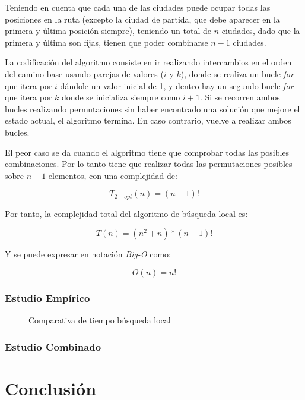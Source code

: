 \documentclass{uc3mpracticas}
\begin{document}
  \vspace{2mm}

  Teniendo en cuenta que cada una de las ciudades puede ocupar todas las posiciones en la ruta (excepto la ciudad de partida, que debe aparecer en la primera y última posición siempre), teniendo un total de $n$ ciudades, dado que la primera y última son fijas, tienen que poder combinarse $n-1$ ciudades.

  \vspace{2mm}

  La codificación del algoritmo consiste en ir realizando intercambios en el orden del camino base usando parejas de valores ($i$ y $k$), donde se realiza un bucle \textit{for} que itera por $i$ dándole un valor inicial de 1, y dentro hay un segundo bucle \textit{for} que itera por $k$ donde se inicializa siempre como $i+1$. Si se recorren ambos bucles realizando permutaciones sin haber encontrado una solución que mejore el estado actual, el algoritmo termina. En caso contrario, vuelve a realizar ambos bucles.

  \vspace{2mm}
  

   El peor caso se da cuando el algoritmo tiene que comprobar todas las posibles combinaciones. Por lo tanto tiene que realizar todas las permutaciones posibles sobre $n-1$ elementos, con una complejidad de:
   
  $$T_{2-opt}(n) = (n-1)!$$
  
  Por tanto, la complejidad total del algoritmo de búsqueda local es:
  
  $$T(n) = (n^2 + n) * (n-1)!$$
  
  Y se puede expresar en notación \textit{Big-O} como:
  
  $$O(n) = n!$$




  \subsubsection{Estudio Empírico}
  
  \begin{figure}[!h]
    \caption{Comparativa de tiempo búsqueda local}
    \label{fig:compLocal}
  \end{figure}



  \subsubsection{Estudio Combinado}

  \clearpage

  \section{Conclusión}
  
\end{document}
